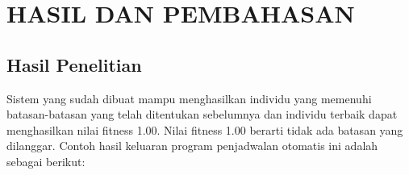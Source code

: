 \chapter{HASIL DAN PEMBAHASAN}
\label{chap:hasilpembahasan}



\section{Hasil Penelitian}
\label{sec:hasil penelitian}
Sistem yang sudah dibuat mampu menghasilkan individu yang memenuhi batasan-batasan yang telah ditentukan sebelumnya dan individu terbaik dapat menghasilkan nilai fitness 1.00. Nilai fitness 1.00 berarti tidak ada batasan yang dilanggar. Contoh hasil keluaran program penjadwalan otomatis ini adalah sebagai berikut:
 
